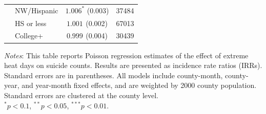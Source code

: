 \documentclass[12pt, a4paper]{article}
\begin{document}
\begin{table}[H]
\begin{tabular}{llcc}
 & NW/Hispanic & $1.006^{*}$ (0.003) & 37484 \\
 & HS or less & $1.001^{}$ (0.002) & 67013 \\
 & College+ & $0.999^{}$ (0.004) & 30439 \\
\bottomrule
\end{tabular}
\vspace{0.5em}
\begin{flushleft}
\footnotesize
\textit{Notes}: This table reports Poisson regression estimates of the effect of extreme heat days on suicide counts. Results are presented as incidence rate ratios (IRRs). Standard errors are in parentheses. All models include county-month, county-year, and year-month fixed effects, and are weighted by 2000 county population. Standard errors are clustered at the county level.\\
$^{*}p<0.1$, $^{**}p<0.05$, $^{***}p<0.01$.
\end{flushleft}
\end{table}





\newpage
{}
\singlespacing
  

\nocite{*}
\end{document}
